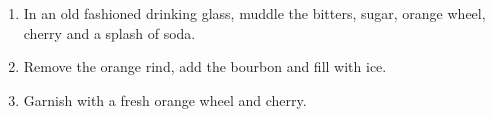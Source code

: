 \documentclass{article}
\begin{document}
\begin{enumerate}
    \item In an old fashioned drinking glass, muddle the bitters, sugar, orange wheel, cherry and a splash of soda.
    \item Remove the orange rind, add the bourbon and fill with ice.
    \item Garnish with a fresh orange wheel and cherry.
\end{enumerate}
\newpage
\end{document}
